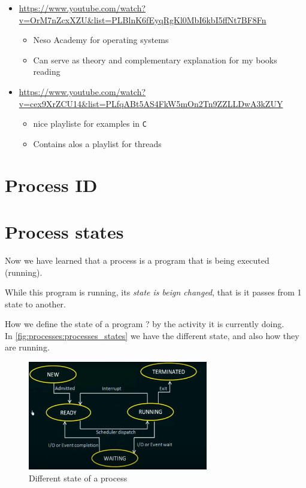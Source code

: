 \documentclass[12pt,a4paper]{book}
\begin{document}
\begin{itemize}

\item \url{https://www.youtube.com/watch?v=OrM7nZcxXZU&list=PLBlnK6fEyqRgKl0MbI6kbI5ffNt7BF8Fn}

    \begin{itemize}
        \item Neso Academy for operating systems

        \item Can serve as theory and complementary explanation for my books reading
    \end{itemize}

\item  \url{https://www.youtube.com/watch?v=cex9XrZCU14&list=PLfqABt5AS4FkW5mOn2Tn9ZZLLDwA3kZUY}

    \begin{itemize}
        \item nice playliste for examples in \verb|C|

        \item Contains alos a playlist for threads
    \end{itemize}

\end{itemize}

\section{Process ID}

\newpage
\section{Process states}

Now we have learned that a process is a program that is being executed (running).

While this program is running, its \textit{state is beign changed}, that is it passes from 1 state to another.

How we define the state of a program ? by the activity it is currently doing.\\

In \autoref{fig:processes:processes_states} we have the different state, and also how they are running.	


\begin{figure}[h]
\centering
\includegraphics[width = 0.7\textwidth, frame]{Figures/processes/processes_states}
\caption{Different state of a process}
\label{fig:processes:processes_states}
\end{figure}
\end{document}
